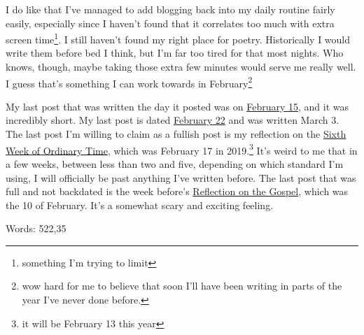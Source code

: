 \documentclass[12pt]{article}[titlepage]
\renewcommand{\,}{\textsuperscript{,}}
\begin{document}
I do like that I've managed to add blogging back into my daily routine fairly easily, especially since I haven't found that it correlates too much with extra screen time\footnote{something I'm trying to limit}.
I still haven't found my right place for poetry.
Historically I would write them before bed I think, but I'm far too tired for that most nights.
Who knows, though, maybe taking those extra few minutes would serve me really well.
I guess that's something I can work towards in February\footnote{wow hard for me to believe that soon I'll have been writing in parts of the year I've never done before.}

My last post that was written the day it posted was on \href{diving-15-feb.html}{February 15}, and it was incredibly short.
My last post is dated \href{still-behind.html}{February 22} and was written March 3.
The last post I'm willing to claim as a fullish post is my reflection on the \href{reflections-on-readings-6-ordinary-c.html}{Sixth Week of Ordinary Time}, which was February 17 in 2019.\footnote{it will be February 13 this year}
It's weird to me that in a few weeks, between less than two and five, depending on which standard I'm using, I will officially be past anything I've written before.
The last post that was full and not backdated is the week before's \href{reflections-on-readings-5-ordinary-c.html}{Reflection on the Gospel}, which was the 10 of February.
It's a somewhat scary and exciting feeling.

Words: 522,35
\end{document}
